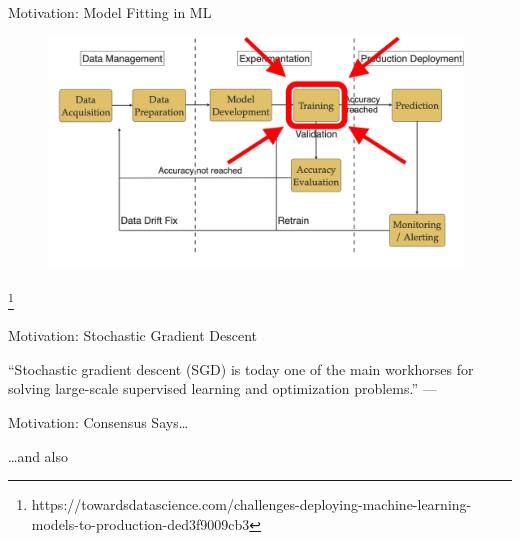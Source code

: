 \documentclass[mathserif,notheorems, hyperref={colorlinks, citecolor=blue, urlcolor=blue, linkcolor=blue}]{beamer}
\newcommand{\source}[1]{{\let\thefootnote\relax\footnote{{\tiny #1}}}}
\def\\{}%
\begin{document}
    \begin{frame}{Motivation: Model Fitting in ML}
       
       \begin{figure}
            \centering
            \includegraphics[width=0.98\textwidth]{figures/workflow_highlighted} 
       \end{figure} 

       \source{https://towardsdatascience.com/challenges-deploying-machine-learning-models-to-production-ded3f9009cb3}
    \end{frame}
    
    \begin{frame}{Motivation: Stochastic Gradient Descent}

        \begin{center}
            \Large
            ``Stochastic gradient descent (SGD) is today one of the main workhorses for solving large-scale supervised learning and optimization problems.''\\
            ---\citet{drori2019complexity}
        \end{center}

    \end{frame}

    \begin{frame}{Motivation: Consensus Says\ldots}

        \begin{center}
            \Large \dots and also~\citet{xu2017second,
            zhang2016parallel,
            patterson2017deep,
            pillaud2018statistical,
            grosse2015scaling,
            assran2018stochastic,
            damaskinos2019aggregathor,
            kawaguchi2020ordered,
            bernstein2018signsgd,
            li2019rsa,
            agarwal2017second,
            hofmann2015variance,
            geffner2019rule,
            assran2020convergence,
            gower2019sgd}
        \end{center}

    \end{frame}
\end{document}
